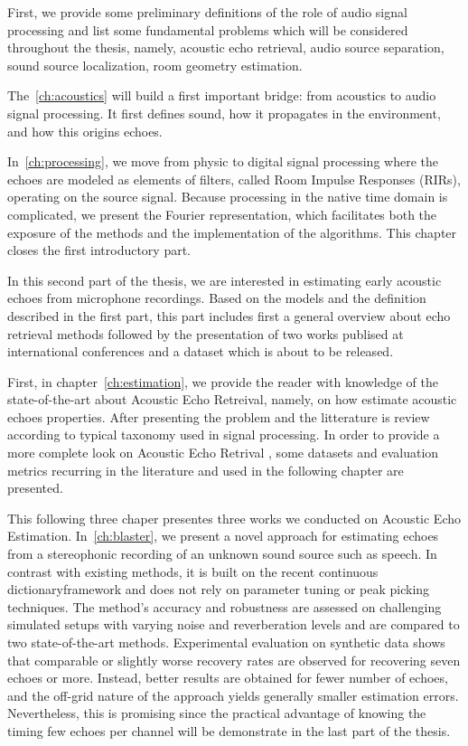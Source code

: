 \mynewline
{}
First, we provide some preliminary definitions of the role of audio signal processing and list some fundamental problems which will be considered throughout the thesis, namely, acoustic echo retrieval, audio source separation, sound source localization, room geometry estimation.





The~\cref{ch:acoustics} will build a first important bridge: from acoustics to audio signal processing. It first defines sound, how it propagates in the environment, and how this origins echoes.

In~\cref{ch:processing},  we move from physic to digital signal processing where the echoes are modeled as elements of filters, called Room Impulse Responses (RIRs), operating on the source signal.
Because processing in the native time domain is complicated, we present the Fourier representation, which facilitates both the exposure of the methods and the implementation of the algorithms.
This chapter closes the first introductory part.

In this second part of the thesis, we are interested in estimating early acoustic echoes from microphone recordings. Based on the models and the definition described in the first part, this part includes first a general overview about echo retrieval methods followed by the presentation of two works publised at international conferences and a dataset which is about to be released.

First, in chapter~\cref{ch:estimation}, we provide the reader with knowledge of the state-of-the-art about Acoustic Echo Retreival, namely, on how estimate acoustic echoes properties. After presenting the problem and the litterature is review according to typical taxonomy used in signal processing. In order to provide a more complete look on Acoustic Echo Retrival , some datasets and evaluation metrics recurring in the literature and used in the following chapter are presented.

This following three chaper presentes three works we conducted on Acoustic Echo Estimation.
In~\cref{ch:blaster}, we present a novel approach for estimating echoes from a stereophonic recording of an unknown sound source such as speech. In contrast with existing methods, it is built on the recent continuous dictionaryframework and does not rely on parameter tuning or peak picking techniques.
The method's accuracy and robustness are assessed on challenging simulated setups with varying noise and reverberation levels and are compared to two state-of-the-art methods. Experimental evaluation on synthetic data shows that comparable or slightly worse recovery rates are observed for recovering seven echoes or more. Instead, better results are obtained for fewer number of echoes, and the off-grid nature of the approach yields generally smaller estimation errors.
Nevertheless, this is promising since the practical advantage of knowing the timing few echoes per channel will be demonstrate in the last part of the thesis.

